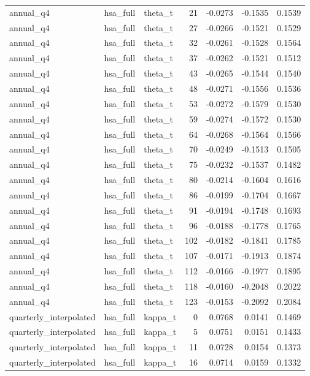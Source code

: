\begin{tabular}{lllrrrr}
annual\_q4 & hsa\_full & theta\_t & 21 & -0.0273 & -0.1535 & 0.1539 \\
annual\_q4 & hsa\_full & theta\_t & 27 & -0.0266 & -0.1521 & 0.1529 \\
annual\_q4 & hsa\_full & theta\_t & 32 & -0.0261 & -0.1528 & 0.1564 \\
annual\_q4 & hsa\_full & theta\_t & 37 & -0.0262 & -0.1521 & 0.1512 \\
annual\_q4 & hsa\_full & theta\_t & 43 & -0.0265 & -0.1544 & 0.1540 \\
annual\_q4 & hsa\_full & theta\_t & 48 & -0.0271 & -0.1556 & 0.1536 \\
annual\_q4 & hsa\_full & theta\_t & 53 & -0.0272 & -0.1579 & 0.1530 \\
annual\_q4 & hsa\_full & theta\_t & 59 & -0.0274 & -0.1572 & 0.1530 \\
annual\_q4 & hsa\_full & theta\_t & 64 & -0.0268 & -0.1564 & 0.1566 \\
annual\_q4 & hsa\_full & theta\_t & 70 & -0.0249 & -0.1513 & 0.1505 \\
annual\_q4 & hsa\_full & theta\_t & 75 & -0.0232 & -0.1537 & 0.1482 \\
annual\_q4 & hsa\_full & theta\_t & 80 & -0.0214 & -0.1604 & 0.1616 \\
annual\_q4 & hsa\_full & theta\_t & 86 & -0.0199 & -0.1704 & 0.1667 \\
annual\_q4 & hsa\_full & theta\_t & 91 & -0.0194 & -0.1748 & 0.1693 \\
annual\_q4 & hsa\_full & theta\_t & 96 & -0.0188 & -0.1778 & 0.1765 \\
annual\_q4 & hsa\_full & theta\_t & 102 & -0.0182 & -0.1841 & 0.1785 \\
annual\_q4 & hsa\_full & theta\_t & 107 & -0.0171 & -0.1913 & 0.1874 \\
annual\_q4 & hsa\_full & theta\_t & 112 & -0.0166 & -0.1977 & 0.1895 \\
annual\_q4 & hsa\_full & theta\_t & 118 & -0.0160 & -0.2048 & 0.2022 \\
annual\_q4 & hsa\_full & theta\_t & 123 & -0.0153 & -0.2092 & 0.2084 \\
quarterly\_interpolated & hsa\_full & kappa\_t & 0 & 0.0768 & 0.0141 & 0.1469 \\
quarterly\_interpolated & hsa\_full & kappa\_t & 5 & 0.0751 & 0.0151 & 0.1433 \\
quarterly\_interpolated & hsa\_full & kappa\_t & 11 & 0.0728 & 0.0154 & 0.1373 \\
quarterly\_interpolated & hsa\_full & kappa\_t & 16 & 0.0714 & 0.0159 & 0.1332 \\

\end{tabular}

